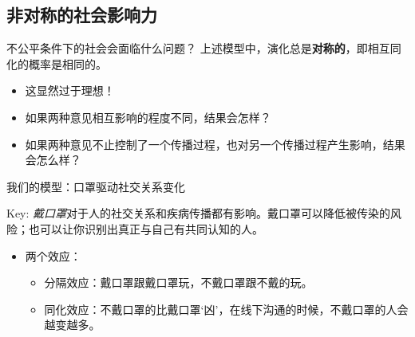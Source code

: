 \documentclass{beamer}
\begin{document}
\subsection{非对称的社会影响力}
\begin{frame}{不公平条件下的社会会面临什么问题？}
上述模型中，演化总是\textbf{对称的}，即相互同化的概率是相同的。
\vspace{1cm}
    \begin{itemize}
    \item 这显然过于理想！
    \vspace{1cm}
    \pause
    \item 如果两种意见相互影响的程度不同，结果会怎样？
    \item 如果两种意见不止控制了一个传播过程，也对另一个传播过程产生影响，结果会怎么样？
\end{itemize}
\end{frame}

\begin{frame}{我们的模型：口罩驱动社交关系变化}
\begin{block}{Key:}
    \textit{戴口罩}对于人的社交关系和疾病传播都有影响。戴口罩可以降低被传染的风险；也可以让你识别出真正与自己有共同认知的人。
\end{block}
\pause
\vspace{1cm}
\begin{itemize}
    \item 两个效应：
    \begin{itemize}
        \item 分隔效应：戴口罩跟戴口罩玩，不戴口罩跟不戴的玩。
        \item 同化效应：不戴口罩的比戴口罩`凶'，在线下沟通的时候，不戴口罩的人会越变越多。
    \end{itemize}
\end{itemize}
\end{frame}
\end{document}
